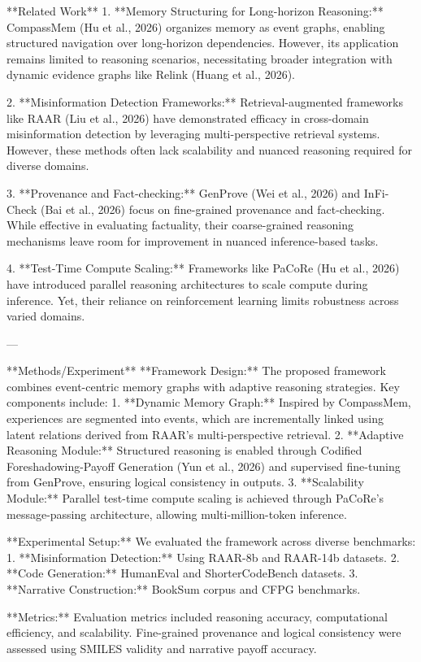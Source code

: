**Related Work**  
1. **Memory Structuring for Long-horizon Reasoning:**  
   CompassMem (Hu et al., 2026) organizes memory as event graphs, enabling structured navigation over long-horizon dependencies. However, its application remains limited to reasoning scenarios, necessitating broader integration with dynamic evidence graphs like Relink (Huang et al., 2026).

2. **Misinformation Detection Frameworks:**  
   Retrieval-augmented frameworks like RAAR (Liu et al., 2026) have demonstrated efficacy in cross-domain misinformation detection by leveraging multi-perspective retrieval systems. However, these methods often lack scalability and nuanced reasoning required for diverse domains.

3. **Provenance and Fact-checking:**  
   GenProve (Wei et al., 2026) and InFi-Check (Bai et al., 2026) focus on fine-grained provenance and fact-checking. While effective in evaluating factuality, their coarse-grained reasoning mechanisms leave room for improvement in nuanced inference-based tasks.

4. **Test-Time Compute Scaling:**  
   Frameworks like PaCoRe (Hu et al., 2026) have introduced parallel reasoning architectures to scale compute during inference. Yet, their reliance on reinforcement learning limits robustness across varied domains.

---

**Methods/Experiment**  
**Framework Design:**  
The proposed framework combines event-centric memory graphs with adaptive reasoning strategies. Key components include:  
1. **Dynamic Memory Graph:** Inspired by CompassMem, experiences are segmented into events, which are incrementally linked using latent relations derived from RAAR's multi-perspective retrieval.  
2. **Adaptive Reasoning Module:** Structured reasoning is enabled through Codified Foreshadowing-Payoff Generation (Yun et al., 2026) and supervised fine-tuning from GenProve, ensuring logical consistency in outputs.  
3. **Scalability Module:** Parallel test-time compute scaling is achieved through PaCoRe's message-passing architecture, allowing multi-million-token inference.

**Experimental Setup:**  
We evaluated the framework across diverse benchmarks:  
1. **Misinformation Detection:** Using RAAR-8b and RAAR-14b datasets.  
2. **Code Generation:** HumanEval and ShorterCodeBench datasets.  
3. **Narrative Construction:** BookSum corpus and CFPG benchmarks.

**Metrics:**  
Evaluation metrics included reasoning accuracy, computational efficiency, and scalability. Fine-grained provenance and logical consistency were assessed using SMILES validity and narrative payoff accuracy.


